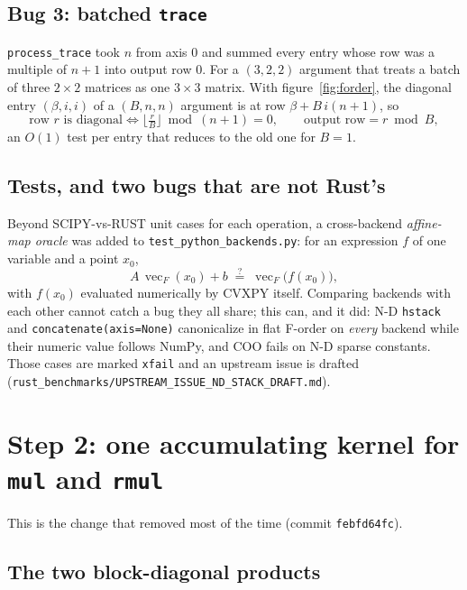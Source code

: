 \documentclass[11pt,a4paper]{article}
\newcommand{\vecF}{\operatorname{vec}_F}
\newcommand{\code}[1]{\texttt{#1}}
\begin{document}
\subsection{Bug 3: batched \code{trace}}

\code{process\_trace} took $n$ from axis 0 and summed every entry whose row was a multiple of $n+1$
into output row 0. For a $(3,2,2)$ argument that treats a batch of three $2\times2$ matrices as one
$3\times3$ matrix. With figure~\ref{fig:forder}, the diagonal entry $(\beta,i,i)$ of a $(B,n,n)$
argument is at row $\beta + B\,i(n+1)$, so
\begin{equation}
  \text{row } r \text{ is diagonal} \iff \Big\lfloor \tfrac{r}{B} \Big\rfloor \bmod (n+1) = 0,
  \qquad \text{output row} = r \bmod B ,
\end{equation}
an $O(1)$ test per entry that reduces to the old one for $B=1$.

\subsection{Tests, and two bugs that are not Rust's}

Beyond SCIPY-vs-RUST unit cases for each operation, a cross-backend \emph{affine-map oracle} was
added to \code{test\_python\_backends.py}: for an expression $f$ of one variable and a point $x_0$,
\begin{equation}
  A\,\vecF(x_0) + b \;\overset{?}{=}\; \vecF\big(f(x_0)\big),
\end{equation}
with $f(x_0)$ evaluated numerically by CVXPY itself. Comparing backends with each other cannot catch a
bug they all share; this can, and it did: N-D \code{hstack} and \code{concatenate(axis=None)}
canonicalize in flat F-order on \emph{every} backend while their numeric value follows NumPy, and COO
fails on N-D sparse constants. Those cases are marked \code{xfail} and an upstream issue is drafted
(\code{rust\_benchmarks/UPSTREAM\_ISSUE\_ND\_STACK\_DRAFT.md}).

\section{Step 2: one accumulating kernel for \code{mul} and \code{rmul}}
\label{sec:kernel}

This is the change that removed most of the time (commit \code{febfd64fc}).

\subsection{The two block-diagonal products}
\end{document}
